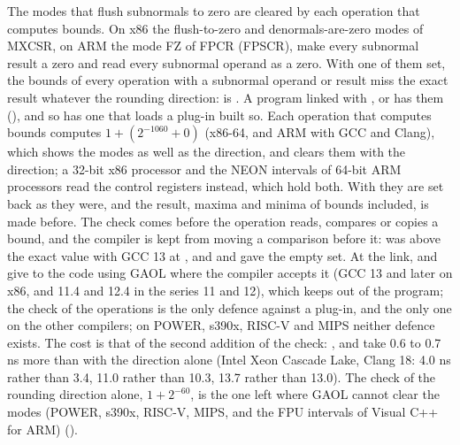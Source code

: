 \documentclass[12pt,a4paper,twoside,openright]{book}
\begin{document}
\medskip
The modes that flush subnormals to zero are cleared by each operation that
computes bounds.\newinvfive{} On x86 the flush-to-zero and denormals-are-zero
modes of MXCSR, on ARM the mode FZ of FPCR (FPSCR), make every subnormal
result a zero and read every subnormal operand as a zero. With one of them
set, the bounds of every operation with a subnormal operand or result miss
the exact result whatever the rounding direction: \code{[1e-300] * [1e-20]}
is \code{[0, 0]}. A program linked with , 
or  has them (), and
so has one that loads a plug-in built so. Each operation that computes
bounds computes $1 + (2^{-1060} + 0)$ (x86-64, and ARM with GCC and Clang),
which shows the modes as well as the direction, and clears them with the
direction; a 32-bit x86 processor and the NEON intervals of 64-bit ARM
processors read the control registers instead, which hold both. With
 they are set back as they were, and the
result, maxima and minima of bounds included, is made before. The check comes
before the operation reads, compares or copies a bound, and the compiler is
kept from moving a comparison before it:  was
above the exact value with GCC 13 at , and  and  gave the empty set. At the link,  and
 give  to the code using GAOL where the
compiler accepts it (GCC 13 and later on x86, and 11.4 and 12.4 in the series
11 and 12), which keeps  out of the program; the check
of the operations is the only defence against a plug-in, and the only one on
the other compilers; on POWER, s390x, RISC-V and MIPS neither defence exists. The cost
is that of the second addition of the check: ,  and
 take 0.6 to 0.7 ns more than with the direction alone (Intel
Xeon Cascade Lake, Clang 18: 4.0 ns rather than 3.4, 11.0 rather than 10.3,
13.7 rather than 13.0). The check of the rounding direction alone,
$1 + 2^{-60}$, is the one left where GAOL cannot clear the modes (POWER,
s390x, RISC-V, MIPS, and the FPU intervals of Visual C++ for ARM)
().
\end{document}
